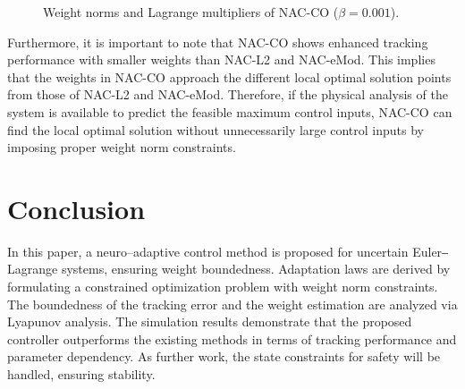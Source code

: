 \documentclass[letterpaper, 10 pt, conference]{ieeeconf}  %
\begin{document}
\begin{figure}[!t]      
    \centering
    \vspace{-1mm}
        \caption{Weight norms and Lagrange multipliers of NAC-CO ($\beta=0.001$).}
    \vspace{-2mm}
        \label{fig: weight and multiplier}
\end{figure}

Furthermore, it is important to note that NAC-CO shows enhanced tracking performance with smaller weights than NAC-L2 and NAC-eMod.
This implies that the weights in NAC-CO approach the different local optimal solution points from those of NAC-L2 and NAC-eMod.
Therefore, if the physical analysis of the system is available to predict the feasible maximum control inputs, NAC-CO can find the local optimal solution without unnecessarily large control inputs by imposing proper weight norm constraints.


\section{Conclusion}\label{sec:conclusion}

%
In this paper, a neuro–adaptive control method is proposed for uncertain Euler‒Lagrange systems, ensuring weight boundedness.
Adaptation laws are derived by formulating a constrained optimization problem with weight norm constraints.
The boundedness of the tracking error and the weight estimation are analyzed via Lyapunov analysis.
The simulation results demonstrate that the proposed controller outperforms the existing methods in terms of tracking performance and parameter dependency.
As further work, the state constraints for safety will be handled, ensuring stability.
%
\end{document}
